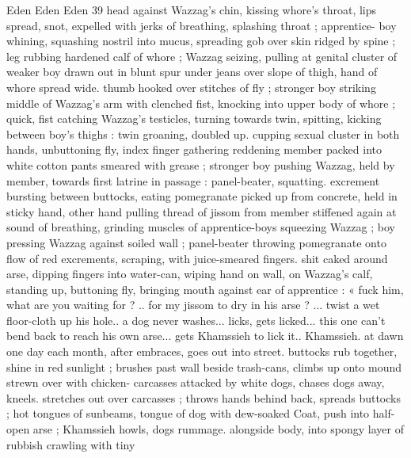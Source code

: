 Eden Eden Eden 39
head against Wazzag's chin, kissing whore’s throat, lips spread,
snot, expelled with jerks of breathing, splashing throat ; apprentice-
boy whining, squashing nostril into mucus, spreading gob over skin
ridged by spine ; leg rubbing hardened calf of whore ; Wazzag
seizing, pulling at genital cluster of weaker boy drawn out in blunt
spur under jeans over slope of thigh, hand of whore spread wide.
thumb hooked over stitches of fly ; stronger boy striking middle of
Wazzag's arm with clenched fist, knocking into upper body of whore
; quick, fist catching Wazzag's testicles, turning towards twin,
spitting, kicking between boy's thighs : twin groaning, doubled up.
cupping sexual cluster in both hands, unbuttoning fly, index finger
gathering reddening member packed into white cotton pants
smeared with grease ; stronger boy pushing Wazzag, held by
member, towards first latrine in passage : panel-beater, squatting.
excrement bursting between buttocks, eating pomegranate picked up
from concrete, held in sticky hand, other hand pulling thread of
jissom from member stiffened again at sound of breathing, grinding
muscles of apprentice-boys squeezing Wazzag ; boy pressing
Wazzag against soiled wall ; panel-beater throwing pomegranate
onto flow of red excrements, scraping, with juice-smeared fingers.
shit caked around arse, dipping fingers into water-can, wiping hand
on wall, on Wazzag's calf, standing up, buttoning fly, bringing mouth
against ear of apprentice : « fuck him, what are you waiting for ? ..
for my jissom to dry in his arse ? ... twist a wet floor-cloth up his
hole.. a dog never washes... licks, gets licked... this one can't bend
back to reach his own arse... gets Khamssieh to lick it.. Khamssieh.
at dawn one day each month, after embraces, goes out into street.
buttocks rub together, shine in red sunlight ; brushes past wall
beside trash-cans, climbs up onto mound strewn over with chicken-
carcasses attacked by white dogs, chases dogs away, kneels.
stretches out over carcasses ; throws hands behind back, spreads
buttocks ; hot tongues of sunbeams, tongue of dog with dew-soaked
Coat, push into half-open arse ; Khamssieh howls, dogs rummage.
alongside body, into spongy layer of rubbish crawling with tiny

